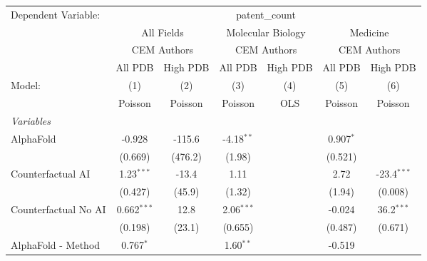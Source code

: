 \begingroup
\centering
\begin{tabular}{lcccccc}
   \tabularnewline \midrule \midrule
   Dependent Variable: & \multicolumn{6}{c}{patent\_count}\\
 & \multicolumn{2}{c}{All Fields} & \multicolumn{2}{c}{Molecular Biology} & \multicolumn{2}{c}{Medicine} \\
\cmidrule(lr){2-3} \cmidrule(lr){4-5} \cmidrule(lr){6-7}
 & \multicolumn{2}{c}{CEM Authors} & \multicolumn{2}{c}{CEM Authors} & \multicolumn{2}{c}{CEM Authors} \\
\cmidrule(lr){2-3} \cmidrule(lr){4-5} \cmidrule(lr){6-7}
 & \multicolumn{1}{c}{All PDB} & \multicolumn{1}{c}{High PDB} & \multicolumn{1}{c}{All PDB} & \multicolumn{1}{c}{High PDB} & \multicolumn{1}{c}{All PDB} & \multicolumn{1}{c}{High PDB} \\
\cmidrule(lr){2-2} \cmidrule(lr){3-3} \cmidrule(lr){4-4} \cmidrule(lr){5-5} \cmidrule(lr){6-6} \cmidrule(lr){7-7}
   Model:                                                     & (1)           & (2)     & (3)           & (4)  & (5)           & (6)\\  
                                                              &  Poisson      & Poisson & Poisson       & OLS  & Poisson       & Poisson\\  
   \midrule
   \emph{Variables}\\
   AlphaFold                                                  & -0.928        & -115.6  & -4.18$^{**}$  &      & 0.907$^{*}$   &   \\   
                                                              & (0.669)       & (476.2) & (1.98)        &      & (0.521)       &   \\   
   Counterfactual AI                                          & 1.23$^{***}$  & -13.4   & 1.11          &      & 2.72          & -23.4$^{***}$\\   
                                                              & (0.427)       & (45.9)  & (1.32)        &      & (1.94)        & (0.008)\\   
   Counterfactual No AI                                       & 0.662$^{***}$ & 12.8    & 2.06$^{***}$  &      & -0.024        & 36.2$^{***}$\\   
                                                              & (0.198)       & (23.1)  & (0.655)       &      & (0.487)       & (0.671)\\   
   AlphaFold - Method                                         & 0.767$^{*}$   &         & 1.60$^{**}$   &      & -0.519        &   \\   

\end{tabular}
